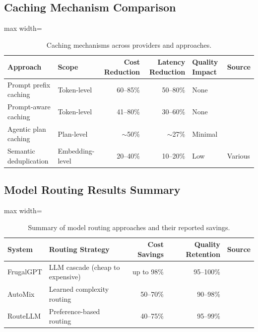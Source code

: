 \documentclass[11pt, a4paper, logo, copyright]{googledeepmind}
\begin{document}
\begin{appendices}
\subsection{Caching Mechanism Comparison}

\begin{table}[H]
\centering
\caption{Caching mechanisms across providers and approaches.}
\label{tab:caching-comparison}
\begin{adjustbox}{max width=\textwidth}
\begin{tabular}{llrrll}
\toprule
\textbf{Approach} & \textbf{Scope} & \textbf{Cost Reduction} & \textbf{Latency Reduction} & \textbf{Quality Impact} & \textbf{Source} \\
\midrule
Prompt prefix caching & Token-level & 60--85\% & 50--80\% & None & \citet{anthropic2026coding} \\
Prompt-aware caching & Token-level & 41--80\% & 30--60\% & None & \citet{liang2026cache} \\
Agentic plan caching & Plan-level & $\sim$50\% & $\sim$27\% & Minimal & \citet{zhang2025plancache} \\
Semantic deduplication & Embedding-level & 20--40\% & 10--20\% & Low & Various \\
\bottomrule
\end{tabular}
\end{adjustbox}
\end{table}

\subsection{Model Routing Results Summary}

\begin{table}[H]
\centering
\caption{Summary of model routing approaches and their reported savings.}
\label{tab:routing-summary}
\begin{adjustbox}{max width=\textwidth}
\begin{tabular}{llrrl}
\toprule
\textbf{System} & \textbf{Routing Strategy} & \textbf{Cost Savings} & \textbf{Quality Retention} & \textbf{Source} \\
\midrule
FrugalGPT & LLM cascade (cheap to expensive) & up to 98\% & 95--100\% & \citet{chen2023frugalgpt} \\
AutoMix & Learned complexity routing & 50--70\% & 90--98\% & \citet{madaan2024automix} \\
RouteLLM & Preference-based routing & 40--75\% & 95--99\% & \citet{ong2024routellm} \\
\bottomrule
\end{tabular}
\end{adjustbox}
\end{table}

\end{appendices}


\end{document}
